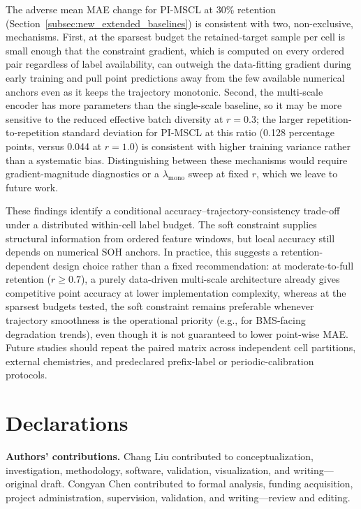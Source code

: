 \documentclass[pdflatex,sn-mathphys-num]{sn-jnl}
\begin{document}
The adverse mean MAE change for PI-MSCL at 30\% retention (Section~\ref{subsec:new_extended_baselines}) is consistent with two, non-exclusive, mechanisms. First, at the sparsest budget the retained-target sample per cell is small enough that the constraint gradient, which is computed on every ordered pair regardless of label availability, can outweigh the data-fitting gradient during early training and pull point predictions away from the few available numerical anchors even as it keeps the trajectory monotonic. Second, the multi-scale encoder has more parameters than the single-scale baseline, so it may be more sensitive to the reduced effective batch diversity at $r=0.3$; the larger repetition-to-repetition standard deviation for PI-MSCL at this ratio (0.128 percentage points, versus 0.044 at $r=1.0$) is consistent with higher training variance rather than a systematic bias. Distinguishing between these mechanisms would require gradient-magnitude diagnostics or a $\lambda_{\mathrm{mono}}$ sweep at fixed $r$, which we leave to future work.

These findings identify a conditional accuracy--trajectory-consistency trade-off under a distributed within-cell label budget. The soft constraint supplies structural information from ordered feature windows, but local accuracy still depends on numerical SOH anchors. In practice, this suggests a retention-dependent design choice rather than a fixed recommendation: at moderate-to-full retention ($r\geq0.7$), a purely data-driven multi-scale architecture already gives competitive point accuracy at lower implementation complexity, whereas at the sparsest budgets tested, the soft constraint remains preferable whenever trajectory smoothness is the operational priority (e.g., for BMS-facing degradation trends), even though it is not guaranteed to lower point-wise MAE. Future studies should repeat the paired matrix across independent cell partitions, external chemistries, and predeclared prefix-label or periodic-calibration protocols.

\backmatter

\section*{Declarations}

\noindent\textbf{Authors' contributions.}
Chang Liu contributed to conceptualization, investigation, methodology, software, validation, visualization, and writing---original draft. Congyan Chen contributed to formal analysis, funding acquisition, project administration, supervision, validation, and writing---review and editing.
\end{document}
